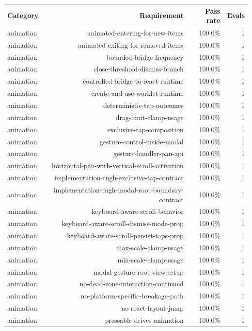 \begin{table}[htbp]
\centering
\begin{tabular}{lrrr}
\toprule
Category & Requirement & Pass rate & Evals \\
\midrule
animation & animated-entering-for-new-items & 100.0\% & 1 \\
animation & animated-exiting-for-removed-items & 100.0\% & 1 \\
animation & bounded-bridge-frequency & 100.0\% & 1 \\
animation & close-threshold-dismiss-branch & 100.0\% & 1 \\
animation & controlled-bridge-to-react-runtime & 100.0\% & 1 \\
animation & create-and-use-worklet-runtime & 100.0\% & 1 \\
animation & deterministic-tap-outcomes & 100.0\% & 1 \\
animation & drag-limit-clamp-usage & 100.0\% & 1 \\
animation & exclusive-tap-composition & 100.0\% & 1 \\
animation & gesture-control-inside-modal & 100.0\% & 1 \\
animation & gesture-handler-pan-api & 100.0\% & 1 \\
animation & horizontal-pan-with-vertical-scroll-activation & 100.0\% & 1 \\
animation & implementation-rngh-exclusive-tap-contract & 100.0\% & 1 \\
animation & implementation-rngh-modal-root-boundary-contract & 100.0\% & 1 \\
animation & keyboard-aware-scroll-behavior & 100.0\% & 1 \\
animation & keyboard-aware-scroll-dismiss-mode-prop & 100.0\% & 1 \\
animation & keyboard-aware-scroll-persist-taps-prop & 100.0\% & 1 \\
animation & max-scale-clamp-usage & 100.0\% & 1 \\
animation & min-scale-clamp-usage & 100.0\% & 1 \\
animation & modal-gesture-root-view-setup & 100.0\% & 1 \\
animation & no-dead-zone-interaction-continued & 100.0\% & 1 \\
animation & no-platform-specific-breakage-path & 100.0\% & 1 \\
animation & no-react-layout-jump & 100.0\% & 1 \\
animation & pressable-drives-animation & 100.0\% & 1 \\

\end{tabular}
\end{table}
